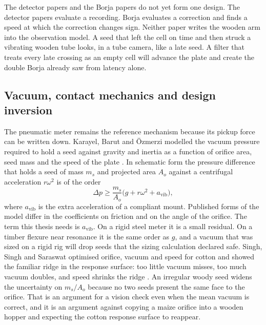The detector papers and the Borja papers do not yet form one design. The detector papers evaluate a recording. Borja evaluates a correction and finds a speed at which the correction changes sign. Neither paper writes the wooden arm into the observation model. A seed that left the cell on time and then struck a vibrating wooden tube looks, in a tube camera, like a late seed. A filter that treats every late crossing as an empty cell will advance the plate and create the double Borja already saw from latency alone.

\subsection{Vacuum, contact mechanics and design inversion}

The pneumatic meter remains the reference mechanism because its pickup force can be written down. Karayel, Barut and {\"O}zmerzi modelled the vacuum pressure required to hold a seed against gravity and inertia as a function of orifice area, seed mass and the speed of the plate \cite{karayel2004}. In schematic form the pressure difference that holds a seed of mass \(m_s\) and projected area \(A_o\) against a centrifugal acceleration \(r\omega^2\) is of the order
\begin{equation}
\label{eq:vacuum}
\Delta p \ge \frac{m_s}{A_o}\bigl(g + r\omega^2 + a_{\mathrm{vib}}\bigr),
\end{equation}
where \(a_{\mathrm{vib}}\) is the extra acceleration of a compliant mount. Published forms of the model differ in the coefficients on friction and on the angle of the orifice. The term this thesis needs is \(a_{\mathrm{vib}}\). On a rigid steel meter it is a small residual. On a timber flexure near resonance it is the same order as \(g\), and a vacuum that was sized on a rigid rig will drop seeds that the sizing calculation declared safe. Singh, Singh and Saraswat optimised orifice, vacuum and speed for cotton and showed the familiar ridge in the response surface: too little vacuum misses, too much vacuum doubles, and speed shrinks the ridge \cite{singh2005}. An irregular woody seed widens the uncertainty on \(m_s/A_o\) because no two seeds present the same face to the orifice. That is an argument for a vision check even when the mean vacuum is correct, and it is an argument against copying a maize orifice into a wooden hopper and expecting the cotton response surface to reappear.


